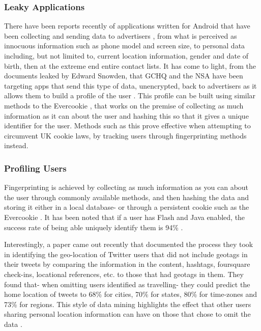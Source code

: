 \subsubsection{Leaky Applications}
\label{intro:leaked-data}
There have been reports recently of applications written for Android that have been collecting and sending data to advertisers  \cite{intro:bbc_flashlight_app}, from what is perceived as innocuous information such as phone model and screen size, to personal data including, but not limited to, current location information, gender and date of birth, then at the extreme end entire contact lists. It has come to light, from the documents leaked by Edward Snowden, that GCHQ and the NSA have been targeting apps that send this type of data, unencrypted, back to advertisers as it allows them to build a profile of the user \cite{intro:angry_leak}. This profile can be built using similar methods to the Evercookie \cite{intro:evercookie}, that works on the premise of collecting as much information as it can about the user and hashing this so that it gives a unique identifier for the user. Methods such as this prove effective when attempting to circumvent UK cookie laws, by tracking users through fingerprinting methods instead.

\subsubsection{Profiling Users}

Fingerprinting is achieved by collecting as much information as you can about the user through commonly available methods, and then hashing the data and storing it either in a local database- or through a persistent cookie such as the Evercookie \cite{intro:evercookie}. It has been noted that if a user has Flash and Java enabled, the success rate of being able uniquely identify them is 94\% \cite{intro:unique_browser}. 

Interestingly, a paper \cite{intro:twitter_home_location} came out recently that documented the process they took in identifying the geo-location of Twitter users that did not include geotags in their tweets by comparing the information in the content, hashtags, foursquare \cite{intro:foursquare_site} check-ins, locational references, etc. to those that had geotags \cite{intro:twitter_location_howto} in them. They found that- when omitting users identified as travelling- they could predict the home location of tweets to 68\% for cities, 70\% for states, 80\% for time-zones and 73\% for regions. This style of data mining highlights the effect that other users sharing personal location information can have on those that chose to omit the data \cite{intro:not_personal}. 

